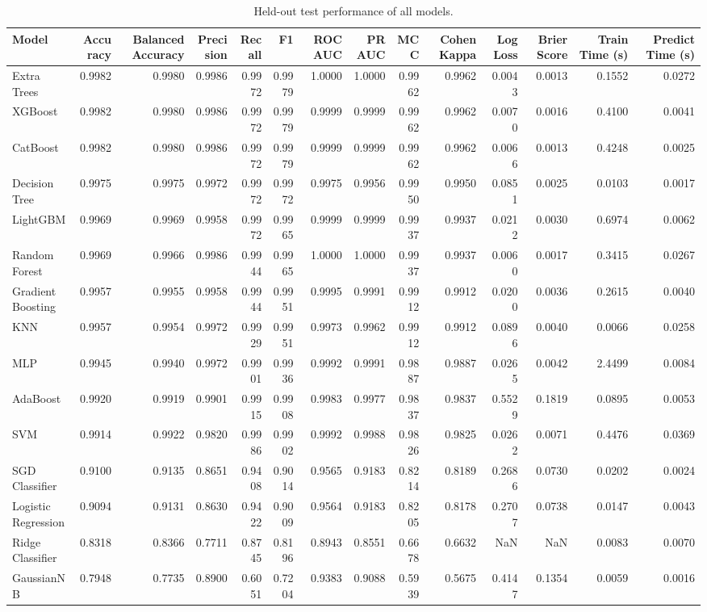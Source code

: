 \begin{table}
\caption{Held-out test performance of all models.}
\label{tab:benchmark}
\begin{tabular}{lrrrrrrrrrrrrr}
\toprule
Model & Accuracy & Balanced Accuracy & Precision & Recall & F1 & ROC AUC & PR AUC & MCC & Cohen Kappa & Log Loss & Brier Score & Train Time (s) & Predict Time (s) \\
\midrule
Extra Trees & 0.9982 & 0.9980 & 0.9986 & 0.9972 & 0.9979 & 1.0000 & 1.0000 & 0.9962 & 0.9962 & 0.0043 & 0.0013 & 0.1552 & 0.0272 \\
XGBoost & 0.9982 & 0.9980 & 0.9986 & 0.9972 & 0.9979 & 0.9999 & 0.9999 & 0.9962 & 0.9962 & 0.0070 & 0.0016 & 0.4100 & 0.0041 \\
CatBoost & 0.9982 & 0.9980 & 0.9986 & 0.9972 & 0.9979 & 0.9999 & 0.9999 & 0.9962 & 0.9962 & 0.0066 & 0.0013 & 0.4248 & 0.0025 \\
Decision Tree & 0.9975 & 0.9975 & 0.9972 & 0.9972 & 0.9972 & 0.9975 & 0.9956 & 0.9950 & 0.9950 & 0.0851 & 0.0025 & 0.0103 & 0.0017 \\
LightGBM & 0.9969 & 0.9969 & 0.9958 & 0.9972 & 0.9965 & 0.9999 & 0.9999 & 0.9937 & 0.9937 & 0.0212 & 0.0030 & 0.6974 & 0.0062 \\
Random Forest & 0.9969 & 0.9966 & 0.9986 & 0.9944 & 0.9965 & 1.0000 & 1.0000 & 0.9937 & 0.9937 & 0.0060 & 0.0017 & 0.3415 & 0.0267 \\
Gradient Boosting & 0.9957 & 0.9955 & 0.9958 & 0.9944 & 0.9951 & 0.9995 & 0.9991 & 0.9912 & 0.9912 & 0.0200 & 0.0036 & 0.2615 & 0.0040 \\
KNN & 0.9957 & 0.9954 & 0.9972 & 0.9929 & 0.9951 & 0.9973 & 0.9962 & 0.9912 & 0.9912 & 0.0896 & 0.0040 & 0.0066 & 0.0258 \\
MLP & 0.9945 & 0.9940 & 0.9972 & 0.9901 & 0.9936 & 0.9992 & 0.9991 & 0.9887 & 0.9887 & 0.0265 & 0.0042 & 2.4499 & 0.0084 \\
AdaBoost & 0.9920 & 0.9919 & 0.9901 & 0.9915 & 0.9908 & 0.9983 & 0.9977 & 0.9837 & 0.9837 & 0.5529 & 0.1819 & 0.0895 & 0.0053 \\
SVM & 0.9914 & 0.9922 & 0.9820 & 0.9986 & 0.9902 & 0.9992 & 0.9988 & 0.9826 & 0.9825 & 0.0262 & 0.0071 & 0.4476 & 0.0369 \\
SGD Classifier & 0.9100 & 0.9135 & 0.8651 & 0.9408 & 0.9014 & 0.9565 & 0.9183 & 0.8214 & 0.8189 & 0.2686 & 0.0730 & 0.0202 & 0.0024 \\
Logistic Regression & 0.9094 & 0.9131 & 0.8630 & 0.9422 & 0.9009 & 0.9564 & 0.9183 & 0.8205 & 0.8178 & 0.2707 & 0.0738 & 0.0147 & 0.0043 \\
Ridge Classifier & 0.8318 & 0.8366 & 0.7711 & 0.8745 & 0.8196 & 0.8943 & 0.8551 & 0.6678 & 0.6632 & NaN & NaN & 0.0083 & 0.0070 \\
GaussianNB & 0.7948 & 0.7735 & 0.8900 & 0.6051 & 0.7204 & 0.9383 & 0.9088 & 0.5939 & 0.5675 & 0.4147 & 0.1354 & 0.0059 & 0.0016 \\
\bottomrule
\end{tabular}
\end{table}
